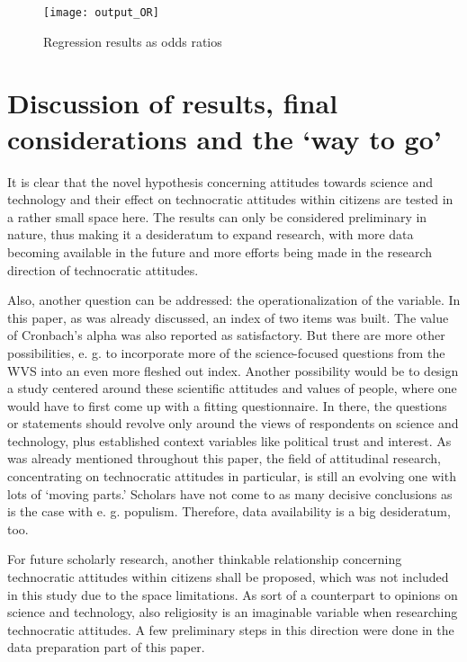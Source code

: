 \documentclass[
  12pt,
  english,
]{article}
\begin{document}
\begin{figure}

{\centering \texttt{[image: output\_OR]} 

}

\caption{Regression results as odds ratios}\label{fig:insert graphics: OR table}
\end{figure}

\newpage{}

\hypertarget{discussion-of-results-final-considerations-and-the-way-to-go}{%
\section{Discussion of results, final considerations and the `way to
go'}\label{discussion-of-results-final-considerations-and-the-way-to-go}}

It is clear that the novel hypothesis concerning attitudes towards
science and technology and their effect on technocratic attitudes within
citizens are tested in a rather small space here. The results can only
be considered preliminary in nature, thus making it a desideratum to
expand research, with more data becoming available in the future and
more efforts being made in the research direction of technocratic
attitudes.

Also, another question can be addressed: the operationalization of the
variable. In this paper, as was already discussed, an index of two items
was built. The value of Cronbach's alpha was also reported as
satisfactory. But there are more other possibilities, e. g. to
incorporate more of the science-focused questions from the WVS into an
even more fleshed out index. Another possibility would be to design a
study centered around these scientific attitudes and values of people,
where one would have to first come up with a fitting questionnaire. In
there, the questions or statements should revolve only around the views
of respondents on science and technology, plus established context
variables like political trust and interest. As was already mentioned
throughout this paper, the field of attitudinal research, concentrating
on technocratic attitudes in particular, is still an evolving one with
lots of `moving parts.' Scholars have not come to as many decisive
conclusions as is the case with e. g. populism. Therefore, data
availability is a big desideratum, too.

For future scholarly research, another thinkable relationship concerning
technocratic attitudes within citizens shall be proposed, which was not
included in this study due to the space limitations. As sort of a
counterpart to opinions on science and technology, also religiosity is
an imaginable variable when researching technocratic attitudes. A few
preliminary steps in this direction were done in the data preparation
part of this paper.
\end{document}
